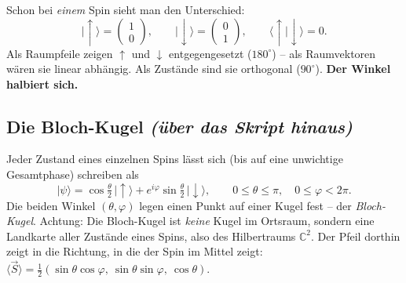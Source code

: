 \documentclass[11pt,a4paper]{article}
\newcommand{\ket}[1]{\lvert #1\rangle}
\newcommand{\up}{{\uparrow}}
\newcommand{\dn}{{\downarrow}}
\begin{document}
Schon bei \emph{einem} Spin sieht man den Unterschied:
\[
\ket\up = \begin{pmatrix}1\\0\end{pmatrix},\qquad \ket\dn = \begin{pmatrix}0\\1\end{pmatrix},\qquad \langle\up|\dn\rangle = 0 .
\]
Als Raumpfeile zeigen $\up$ und $\dn$ entgegengesetzt ($180^\circ$) -- als Raumvektoren wären sie linear abhängig. Als Zustände sind sie orthogonal ($90^\circ$). \textbf{Der Winkel halbiert sich.}

\subsection{Die Bloch-Kugel \emph{(über das Skript hinaus)}}

Jeder Zustand eines einzelnen Spins lässt sich (bis auf eine unwichtige Gesamtphase) schreiben als
\[
\boxed{\ket\psi = \cos\tfrac\theta2\,\ket\up + e^{i\varphi}\sin\tfrac\theta2\,\ket\dn},\qquad 0\le\theta\le\pi,\quad 0\le\varphi<2\pi .
\]
Die beiden Winkel $(\theta,\varphi)$ legen einen Punkt auf einer Kugel fest -- der \emph{Bloch-Kugel}. Achtung: Die Bloch-Kugel ist \emph{keine} Kugel im Ortsraum, sondern eine Landkarte aller Zustände eines Spins, also des Hilbertraums $\mathbb C^2$. Der Pfeil dorthin zeigt in die Richtung, in die der Spin im Mittel zeigt: $\langle\vec S\rangle = \tfrac12(\sin\theta\cos\varphi,\ \sin\theta\sin\varphi,\ \cos\theta)$.

\begin{center}
\end{center}
\end{document}
